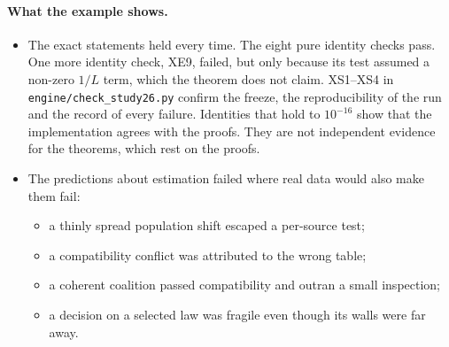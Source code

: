 \documentclass[11pt]{article}
\theoremstyle{definition}\newtheorem{definition}[theorem]{Definition}\newtheorem{remark}[theorem]{Remark}\newtheorem{example}[theorem]{Example}\newtheorem{problem}[theorem]{Open problem}\crefname{problem}{Problem}{Problems}
\begin{document}
\paragraph{What the example shows.}
\begin{itemize}
\item The exact statements held every time. The eight pure identity checks pass. One more identity check, XE9, failed, but only because its test assumed a non-zero $1/L$ term, which the theorem does not claim. XS1--XS4 in \texttt{engine/check\_study26.py} confirm the freeze, the reproducibility of the run and the record of every failure. Identities that hold to $10^{-16}$ show that the implementation agrees with the proofs. They are not independent evidence for the theorems, which rest on the proofs.
\item The predictions about estimation failed where real data would also make them fail:
\begin{itemize}
\item a thinly spread population shift escaped a per-source test;
\item a compatibility conflict was attributed to the wrong table;
\item a coherent coalition passed compatibility and outran a small inspection;
\item a decision on a selected law was fragile even though its walls were far away.
\end{itemize}
\end{itemize}
\end{document}
